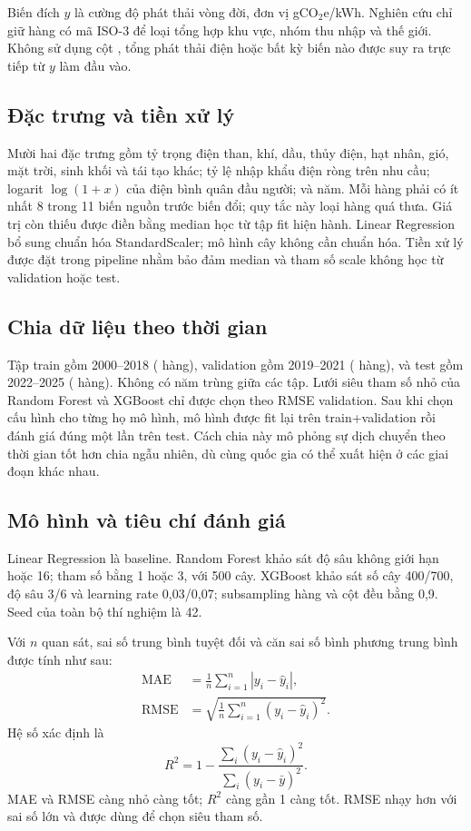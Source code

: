 \documentclass[11pt,a4paper]{article}
\begin{document}
Biến đích $y$ là cường độ phát thải vòng đời, đơn vị gCO$_2$e/kWh. Nghiên cứu
chỉ giữ hàng có mã ISO-3 để loại tổng hợp khu vực, nhóm thu nhập và thế giới.
Không sử dụng cột , tổng phát thải điện hoặc
bất kỳ biến nào được suy ra trực tiếp từ $y$ làm đầu vào.

\subsection{Đặc trưng và tiền xử lý}

Mười hai đặc trưng gồm tỷ trọng điện than, khí, dầu, thủy điện, hạt nhân, gió,
mặt trời, sinh khối và tái tạo khác; tỷ lệ nhập khẩu điện ròng trên nhu cầu;
logarit $\log(1+x)$ của điện bình quân đầu người; và năm. Mỗi hàng phải có ít
nhất 8 trong 11 biến nguồn trước biến đổi; quy tắc này loại \ExcludedRows{} hàng
quá thưa. Giá trị còn thiếu được điền bằng median học từ tập fit hiện hành.
Linear Regression bổ sung chuẩn hóa StandardScaler; mô hình cây không cần chuẩn
hóa. Tiền xử lý được đặt trong pipeline nhằm bảo đảm median và tham số scale
không học từ validation hoặc test.

\subsection{Chia dữ liệu theo thời gian}

Tập train gồm 2000--2018 (\TrainRows{} hàng), validation gồm 2019--2021
(\ValidationRows{} hàng), và test gồm 2022--2025 (\TestRows{} hàng). Không có
năm trùng giữa các tập. Lưới siêu tham số nhỏ của Random Forest và XGBoost chỉ
được chọn theo RMSE validation. Sau khi chọn cấu hình cho từng họ mô hình, mô
hình được fit lại trên train+validation rồi đánh giá đúng một lần trên test.
Cách chia này mô phỏng sự dịch chuyển theo thời gian tốt hơn chia ngẫu nhiên,
dù cùng quốc gia có thể xuất hiện ở các giai đoạn khác nhau.

\subsection{Mô hình và tiêu chí đánh giá}

Linear Regression là baseline. Random Forest khảo sát độ sâu không giới hạn hoặc
16; tham số  bằng 1 hoặc 3, với 500 cây. XGBoost khảo sát
số cây 400/700, độ sâu 3/6 và learning rate 0,03/0,07; subsampling hàng và cột
đều bằng 0,9. Seed của toàn bộ thí nghiệm là 42.

Với $n$ quan sát, sai số trung bình tuyệt đối và căn sai số bình phương trung
bình được tính như sau:
\begin{align}
\mathrm{MAE} &= \frac{1}{n}\sum_{i=1}^{n}|y_i-\hat{y}_i|,\\
\mathrm{RMSE} &= \sqrt{\frac{1}{n}\sum_{i=1}^{n}(y_i-\hat{y}_i)^2}.
\end{align}
Hệ số xác định là
\begin{equation}
R^2=1-\frac{\sum_i(y_i-\hat{y}_i)^2}{\sum_i(y_i-\bar{y})^2}.
\end{equation}
MAE và RMSE càng nhỏ càng tốt; $R^2$ càng gần 1 càng tốt. RMSE nhạy hơn với sai
số lớn và được dùng để chọn siêu tham số.
\end{document}
